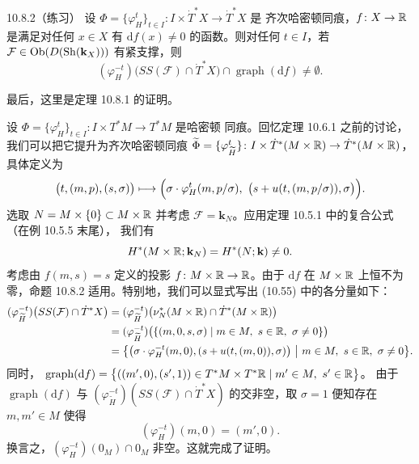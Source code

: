 \begin{wprop}{10.8.2（练习）}
  设 $\Phi=\{\varphi_H^t\}_{t\in I}\colon I\times\dot T^*X\to\dot T^*X$ 是
  齐次哈密顿同痕，$f\colon X\to\mathbb{R}$ 是满足对任何 $x\in X$ 有
  $\mathrm df(x)\ne0$ 的函数。则对任何 $t\in I$，若
  $\mathcal F\in\operatorname{Ob}(D(\operatorname{Sh}(\mathbf{k}_X)))$ 有紧支撑，则
  \begin{equation}\tag{10.55}
    (\varphi_H^{-t})\bigl(SS(\mathcal F)\cap\dot T^*X\bigr)
    \cap\operatorname{graph}(\mathrm df)\ne\emptyset.
  \end{equation}
\end{wprop}

最后，这里是定理 10.8.1 的证明。

\begin{wproof}[定理 10.8.1 的证明]
  设 $\Phi=\{\varphi_H^t\}_{t\in I}\colon I\times T^*M\to T^*M$ 是哈密顿
  同痕。回忆定理 10.6.1 之前的讨论，我们可以把它提升为齐次哈密顿同痕
  $\widetilde\Phi=\{\varphi_{\widetilde H}^t\}\colon
  I\times\dot T^*(M\times\mathbb{R})\to\dot T^*(M\times\mathbb{R})$，具体定义为
  \[
    \bigl(t,(m,p),(s,\sigma)\bigr)
    \longmapsto
    \Bigl(\sigma\cdot\varphi_H^t(m,p/\sigma),\ 
    \bigl(s+u(t,(m,p/\sigma)),\sigma\bigr)\Bigr).
  \]
  选取 $N=M\times\{0\}\subset M\times\mathbb{R}$ 并考虑
  $\mathcal F=\mathbf{k}_N$。应用定理 10.5.1 中的复合公式（在例 10.5.5 末尾），
  我们有
  \[
    H^*(M\times\mathbb{R};\mathbf{k}_N)=H^*(N;\mathbf{k})\ne0.
  \]
  考虑由 $f(m,s)=s$ 定义的投影 $f\colon M\times\mathbb{R}\to\mathbb{R}$。由于 $\mathrm df$
  在 $M\times\mathbb{R}$ 上恒不为零，命题 10.8.2 适用。特别地，我们可以显式写出
  (10.55) 中的各分量如下：
  \[
    \begin{aligned}
      (\varphi_{\widetilde H}^{-t})\bigl(SS(\mathcal F)\cap\dot T^*X\bigr)
      &=(\varphi_{\widetilde H}^{-t})\bigl(\nu_N^*(M\times\mathbb{R})
        \cap\dot T^*(M\times\mathbb{R})\bigr)\\
      &=(\varphi_{\widetilde H}^{-t})\bigl(\{(m,0,s,\sigma)\mid
        m\in M,\ s\in\mathbb{R},\ \sigma\ne0\}\bigr)\\
      &=\bigl\{\bigl(\sigma\cdot\varphi_H^{-t}(m,0),
        (s+u(t,(m,0)),\sigma)\bigr)\ \big|\
        m\in M,\ s\in\mathbb{R},\ \sigma\ne0\bigr\}.
    \end{aligned}
  \]
  同时，
  $\operatorname{graph}(\mathrm df)
  =\bigl\{((m',0),(s',1))\in T^*M\times T^*\R\mid m'\in M,\ s'\in\R\bigr\}$。
  由于 $\operatorname{graph}(\mathrm df)$ 与
  $(\varphi_{\widetilde H}^{-t})(SS(\mathcal F)\cap\dot T^*X)$ 的交非空，取
  $\sigma=1$ 便知存在 $m,m'\in M$ 使得
  \[
    (\varphi_H^{-t})(m,0)=(m',0).
  \]
  换言之，$(\varphi_H^{-t})(0_M)\cap0_M$ 非空。这就完成了证明。
\end{wproof}

